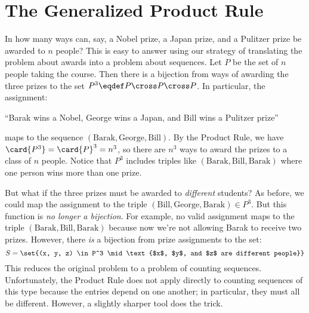 \section{The Generalized Product Rule}\label{generalized_product_sec}
In how many ways can, say, a Nobel prize, a Japan prize, and a
Pulitzer prize be awarded to $n$ people?  This is easy to answer using
our strategy of translating the problem about awards into a problem
about sequences.  Let $P$ be the set of $n$ people taking the course.
Then there is a bijection from ways of awarding the three prizes to
the set $P^3 \eqdef P \cross P \cross P$.  In particular, the
assignment:
\begin{center}
``Barak wins a Nobel, George wins a Japan, and Bill wins a Pulitzer prize''
\end{center}
maps to the sequence $(\text{Barak}, \text{George}, \text{Bill})$.  By
the Product Rule, we have $\card{P^3}= \card{P}^3 = n^3$, so there are
$n^3$ ways to award the prizes to a class of $n$ people.  Notice that
$P^3$ includes triples like $(\text{Barak}, \text{Bill},
\text{Barak})$ where one person wins more than one prize.

But what if the three prizes must be awarded to \emph{different}
students?  As before, we could map the assignment to the triple
$(\text{Bill}, \text{George}, \text{Barak}) \in P^3$.  But this
function is \emph{no longer a bijection}.  For example, no valid
assignment maps to the triple $(\text{Barak}, \text{Bill},
\text{Barak})$ because now we're not allowing Barak to receive two
prizes.  However, there \emph{is} a bijection from prize assignments to
the set:
\[
S = \set{(x, y, z) \in P^3 \mid \text{$x$, $y$, and $z$ are different people}}
\]
This reduces the original problem to a problem of counting sequences.
Unfortunately, the Product Rule does not apply directly to counting
sequences of this type because the entries depend on one another; in
particular, they must all be different.  However, a slightly sharper
tool does the trick.


